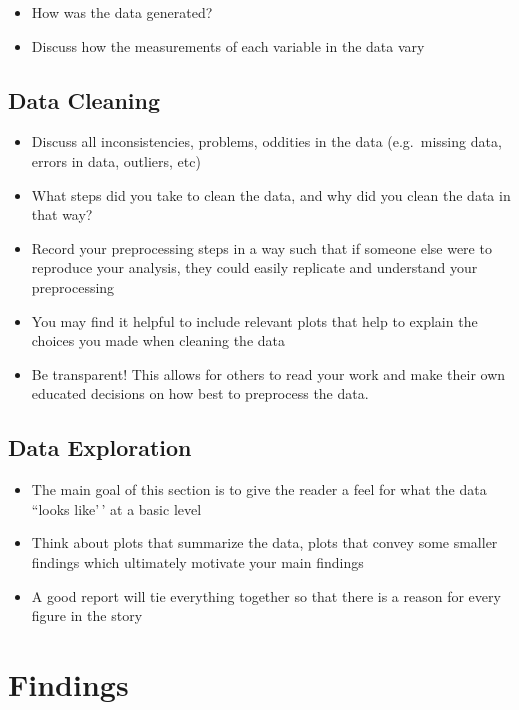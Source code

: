 \documentclass[10pt,letterpaper]{article}
\begin{document}
\begin{itemize}
\item How was the data generated?
\item Discuss how the measurements of each variable in the data vary
\end{itemize}

\subsection{Data Cleaning}\label{data-cleaning}

\begin{itemize}
\item Discuss all inconsistencies, problems, oddities in the data (e.g.~missing data, errors in data, outliers, etc)
\item What steps did you take to clean the data, and why did you clean the data in that way?
\item Record your preprocessing steps in a way such that if someone else were to reproduce your analysis, they could easily replicate and understand your preprocessing
\item You may find it helpful to include relevant plots that help to explain the choices you made when cleaning the data
\item Be transparent! This allows for others to read your work and make their own educated decisions on how best to preprocess the data.
\end{itemize}

\subsection{Data Exploration}\label{data-exploration}

\begin{itemize}
\item The main goal of this section is to give the reader a feel for what the data ``looks like'\,' at a basic level
\item Think about plots that summarize the data, plots that convey some smaller findings which ultimately motivate your main findings
\item A good report will tie everything together so that there is a reason for every figure in the story
\end{itemize}

\section{Findings}\label{findings}
\end{document}
